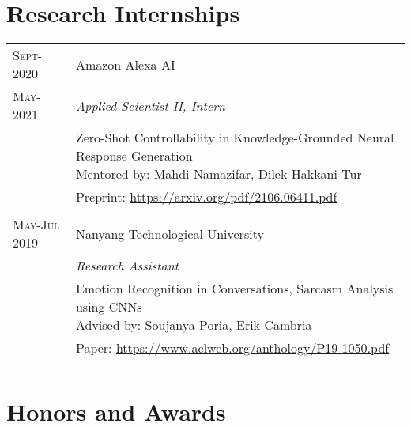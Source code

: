 \documentclass[a4paper,10pt]{article}
\begin{document}
\section{Research Internships}
\vspace{0.1cm}

\begin{tabular}{R{2cm}| L{11cm}}

 \textsc{Sept- 2020} & Amazon Alexa AI \\
 \textsc{May- 2021}&\emph{Applied Scientist II, Intern}\\
 &\footnotesize{Zero-Shot Controllability in Knowledge-Grounded Neural Response Generation \newline Mentored by: Mahdi Namazifar, Dilek Hakkani-Tur}\\
 &\footnotesize{Preprint: \url{https://arxiv.org/pdf/2106.06411.pdf}}\\
  \\
 
 \textsc{May-Jul 2019} & Nanyang Technological University \\
 &\emph{Research Assistant}\\
 &\footnotesize{Emotion Recognition in Conversations, Sarcasm Analysis using CNNs \newline Advised by: Soujanya Poria, Erik Cambria}\\
 &\footnotesize{Paper: \url{https://www.aclweb.org/anthology/P19-1050.pdf}}\\
  \\
\end{tabular}


\section{Honors and Awards}
\vspace{0.1cm}
\end{document}
